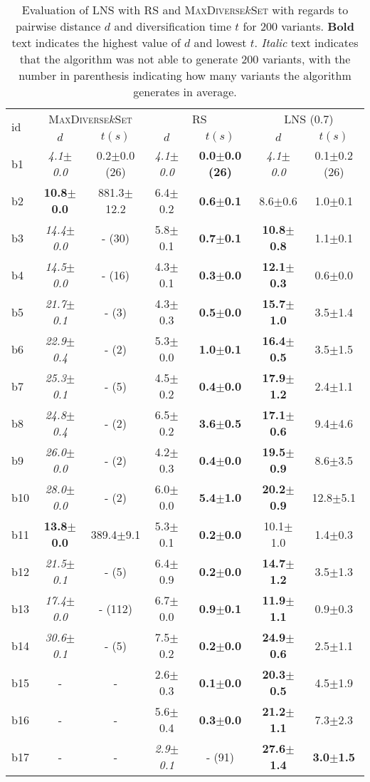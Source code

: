 \begin{longtable}{|l|c|c|c|c|c|c|}
\caption{\label{tab:dist_max_rs_lns} Evaluation of \ac{LNS} with \ac{RS} and \textsc{MaxDiverse$k$Set}
		with regards to pairwise distance $d$ and diversification time $t$ for 200 variants. \textbf{Bold} text indicates the highest value of $d$
		and lowest $t$. \textit{Italic} text indicates that the algorithm was not able to generate
		200 variants, with the number in parenthesis indicating how many variants the algorithm generates in average.}\\
\hline
\multirow{2}{*}{id}&\multicolumn{2}{c|}{\textsc{MaxDiverse$k$Set}}&\multicolumn{2}{c|}{{RS}}&\multicolumn{2}{c|}{LNS (0.7)}\\
\cline{2-7}
&$d$&$t(s)$&$d$&$t(s)$&$d$&$t(s)$\\
\hline
b1&\textit{4.1$\pm$0.0} & 0.2$\pm$0.0 (26)&\textit{4.1$\pm$0.0} & \textbf{0.0$\pm$0.0 (26)}&\textit{4.1$\pm$0.0} & 0.1$\pm$0.2 (26)
\\
b2&\textbf{10.8$\pm$0.0} & 881.3$\pm$12.2&6.4$\pm$0.2 & \textbf{0.6$\pm$0.1}&8.6$\pm$0.6 & 1.0$\pm$0.1
\\
b3&\textit{14.4$\pm$0.0} & - (30)&5.8$\pm$0.1 & \textbf{0.7$\pm$0.1}&\textbf{10.8$\pm$0.8} & 1.1$\pm$0.1
\\
b4&\textit{14.5$\pm$0.0} & - (16)&4.3$\pm$0.1 & \textbf{0.3$\pm$0.0}&\textbf{12.1$\pm$0.3} & 0.6$\pm$0.0
\\
b5&\textit{21.7$\pm$0.1} & - (3)&4.3$\pm$0.3 & \textbf{0.5$\pm$0.0}&\textbf{15.7$\pm$1.0} & 3.5$\pm$1.4
\\
b6&\textit{22.9$\pm$0.4} & - (2)&5.3$\pm$0.0 & \textbf{1.0$\pm$0.1}&\textbf{16.4$\pm$0.5} & 3.5$\pm$1.5
\\
b7&\textit{25.3$\pm$0.1} & - (5)&4.5$\pm$0.2 & \textbf{0.4$\pm$0.0}&\textbf{17.9$\pm$1.2} & 2.4$\pm$1.1
\\
b8&\textit{24.8$\pm$0.4} & - (2)&6.5$\pm$0.2 & \textbf{3.6$\pm$0.5}&\textbf{17.1$\pm$0.6} & 9.4$\pm$4.6
\\
b9&\textit{26.0$\pm$0.0} & - (2)&4.2$\pm$0.3 & \textbf{0.4$\pm$0.0}&\textbf{19.5$\pm$0.9} & 8.6$\pm$3.5
\\
b10&\textit{28.0$\pm$0.0} & - (2)&6.0$\pm$0.0 & \textbf{5.4$\pm$1.0}&\textbf{20.2$\pm$0.9} & 12.8$\pm$5.1
\\
b11&\textbf{13.8$\pm$0.0} & 389.4$\pm$9.1&5.3$\pm$0.1 & \textbf{0.2$\pm$0.0}&10.1$\pm$1.0 & 1.4$\pm$0.3
\\
b12&\textit{21.5$\pm$0.1} & - (5)&6.4$\pm$0.9 & \textbf{0.2$\pm$0.0}&\textbf{14.7$\pm$1.2} & 3.5$\pm$1.3
\\
b13&\textit{17.4$\pm$0.0} & - (112)&6.7$\pm$0.0 & \textbf{0.9$\pm$0.1}&\textbf{11.9$\pm$1.1} & 0.9$\pm$0.3
\\
b14&\textit{30.6$\pm$0.1} & - (5)&7.5$\pm$0.2 & \textbf{0.2$\pm$0.0}&\textbf{24.9$\pm$0.6} & 2.5$\pm$1.1
\\
b15&- & -&2.6$\pm$0.3 & \textbf{0.1$\pm$0.0}&\textbf{20.3$\pm$0.5} & 4.5$\pm$1.9
\\
b16&- & -&5.6$\pm$0.4 & \textbf{0.3$\pm$0.0}&\textbf{21.2$\pm$1.1} & 7.3$\pm$2.3
\\
b17&- & -&\textit{2.9$\pm$0.1} & - (91)&\textbf{27.6$\pm$1.4} & \textbf{3.0$\pm$1.5}
\\
\hline
\end{longtable}
